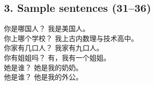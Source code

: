 \documentclass[12pt]{article}
\begin{document}
\begin{CJK}{UTF8}{gbsn}
\section*{3. Sample sentences (31--36)}
你是哪国人？ 我是美国人。 \\
你上哪个学校？ 我上古内数理与技术高中。 \\
你家有几口人？ 我家有九口人。 \\
你有姐姐吗？ 有，我有一个姐姐。 \\
她是谁？ 她是我的奶奶。 \\
他是谁？ 他是我的外公。

\end{CJK}

\end{document}
